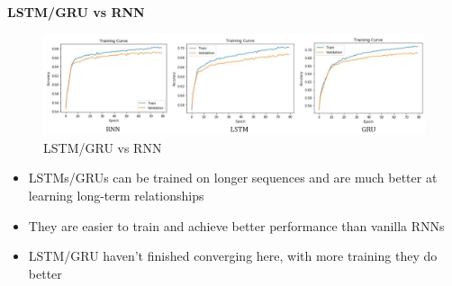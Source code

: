 \textbf{LSTM/GRU vs RNN}

\begin{figure}[h!t]
    \centering
    \includegraphics[width=1\linewidth]{lstmgrurnn.png}
    \caption{LSTM/GRU vs RNN}
    \label{fig:enter-label}
\end{figure}

\begin{itemize}
    \item LSTMs/GRUs can be trained on longer sequences and are much better at learning
long-term relationships
\item They are easier to train and achieve better performance than vanilla RNNs
\item LSTM/GRU haven't finished converging here, with more training they do better
\end{itemize}

